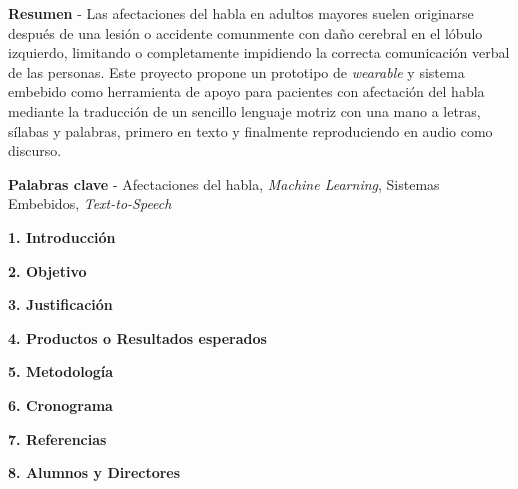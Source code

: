 \documentclass[10.5pt]{report}
\begin{document}


\hfill\break
\justifying
\textbf{Resumen} - Las afectaciones del habla en adultos mayores suelen originarse después de una lesión o accidente comunmente con daño cerebral en el lóbulo izquierdo, limitando o completamente impidiendo la correcta comunicación verbal de las personas. Este proyecto propone un prototipo de \textit{wearable} y sistema embebido como herramienta de apoyo para pacientes con afectación del habla mediante la traducción de un sencillo lenguaje motriz con una mano a letras, sílabas y palabras, primero en texto y finalmente reproduciendo en audio como discurso.

\hfill \break
\textbf{Palabras clave} - Afectaciones del habla, \textit{Machine Learning}, Sistemas Embebidos, \textit{Text-to-Speech}

\hfill \break
{\fontsize{12}{14}\textbf{1. Introducción}}
\hfill \break


\hfill \break
{\fontsize{12}{14}\textbf{2. Objetivo}}
\hfill \break
\justifying


\hfill \break
{\fontsize{12}{14}\textbf{3. Justificación}}
\hfill \break
\justifying


\hfill \break
{\fontsize{12}{14}\textbf{4. Productos o Resultados esperados}}
\hfill \break
\justifying


\newpage
\hfill \break
{\fontsize{12}{14}\textbf{5. Metodología}}
\hfill \break
\justifying


\newpage
\hfill \break
{\fontsize{12}{14}\textbf{6. Cronograma}}


\newpage
\hfill \break
{\fontsize{12}{14}\textbf{7. Referencias}}

\hfill \break


\newpage

{\fontsize{12}{14}\textbf{8. Alumnos y Directores}}


\end{document}
